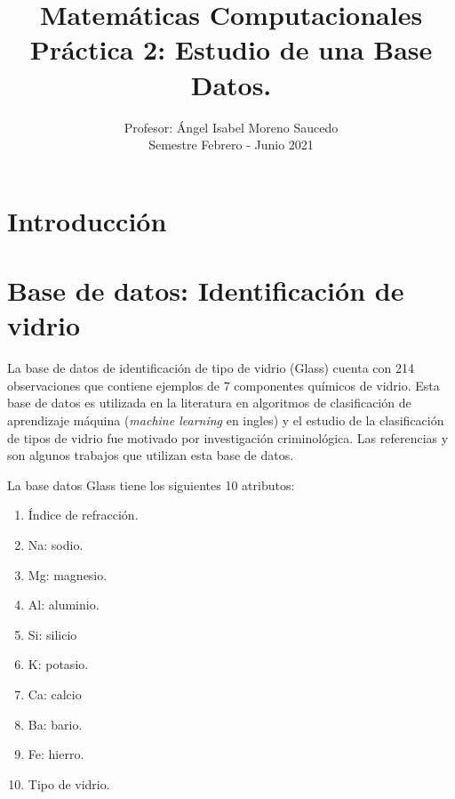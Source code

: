 
\graphicspath{{../../../matematicascomputacionales/Practica_02/figuras/}}

\title{Matemáticas Computacionales \\ Práctica 2: Estudio de una Base Datos.}
\author{Profesor: Ángel Isabel Moreno Saucedo \\ Semestre Febrero - Junio 2021}
\date{}



\maketitle

\section{Introducci\'{o}n} \label{sec:intro}



\section{Base de datos: Identificación de vidrio} \label{sec:basededatos}

La base de datos de identificación de tipo de vidrio (Glass) cuenta con 214 observaciones que contiene ejemplos de 7 componentes químicos de vidrio. Esta base de datos es utilizada en la literatura en algoritmos de clasificación de aprendizaje máquina (\emph{machine learning} en ingles) y el estudio de la clasificación de tipos de vidrio fue motivado por investigación criminológica. Las referencias \citep{krawiec2002genetic} y \citep{zhong2007regularized} son algunos trabajos que utilizan esta base de datos.

La base datos Glass tiene los siguientes 10 atributos:
\begin{enumerate}
	\item Índice de refracción.
	\item Na: sodio.
	\item Mg: magnesio.
	\item Al: aluminio.
	\item Si: silicio
	\item K: potasio.
	\item Ca: calcio
	\item Ba: bario.
	\item Fe: hierro.
	\item Tipo de vidrio.
\end{enumerate}

